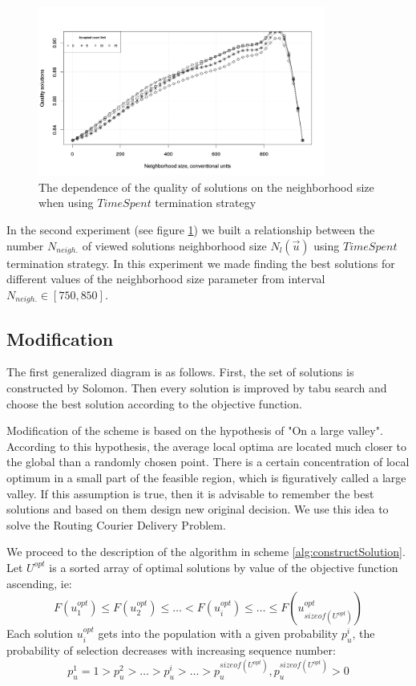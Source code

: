 \documentclass[]{TAACpaper}
\begin{document}
\begin{figure}[h]
	\hfil\includegraphics[height=2.2in]{images/acceptedCountLimit}\hfil
	\caption
	{
	  The dependence of the quality of solutions on the neighborhood size when using $ TimeSpent $ termination strategy
	}
	\label{aba:fig4}
\end{figure}

In the second experiment (see figure \ref{aba:fig4}) we built a relationship between the number $N_{neigh.}$ of viewed solutions neighborhood size $N_l(\vec{u})$ using $TimeSpent$ termination strategy. In this experiment we made finding the best solutions for different values of the neighborhood size parameter from interval $N_{neigh.}\in[750, 850]$.

\subsection{Modification}

The first generalized diagram is as follows. First, the set of solutions is constructed by Solomon. Then every solution is improved by tabu search and choose the best solution according to the objective function.

Modification of the scheme is based on the hypothesis of "On a large valley"\cite{opt_Kochetov}. According to this hypothesis, the average local optima are located much closer to the global than a randomly chosen point. There is a certain concentration of local optimum in a small part of the feasible region, which is figuratively called a large valley. If this assumption is true, then it is advisable to remember the best solutions and based on them design new original decision. We use this idea to solve the  Routing Courier Delivery Problem.

We proceed to the description of the algorithm in scheme \ref{alg:constructSolution}. Let $U^{opt}$ is a sorted array of optimal solutions by value of the objective function ascending,  ie:
\begin{equation} \label{u_sorted}
F(u^{opt}_1) \leq F(u^{opt}_2) \leq \ldots < F(u^{opt}_i) \leq \ldots \leq F(u^{opt}_{sizeof(U^{opt})})
\end{equation}
Each solution $u^{opt}_i$ gets into the population with a given probability $p^i_u$, the probability of selection decreases with increasing sequence number:
\begin{equation} \label{p_sorted}
p^1_u = 1 > p^2_u > \ldots > p^i_u> \ldots   > p^{sizeof(U^{opt})}_u,  p^{sizeof(U^{opt})}_u > 0
\end{equation}
\end{document}
